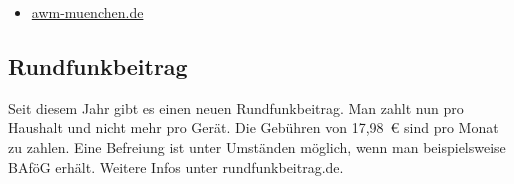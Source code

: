 \begin{itemize}
	\item \url{awm-muenchen.de}
\end{itemize}



\subsection{Rundfunkbeitrag}
Seit diesem Jahr gibt es einen neuen Rundfunkbeitrag. Man zahlt nun pro Haushalt und nicht mehr pro Gerät. Die Gebühren von 17,98~€ sind pro Monat zu zahlen. Eine Befreiung ist unter Umständen möglich, wenn man beispielsweise BAföG erhält. Weitere Infos unter rundfunkbeitrag.de.

